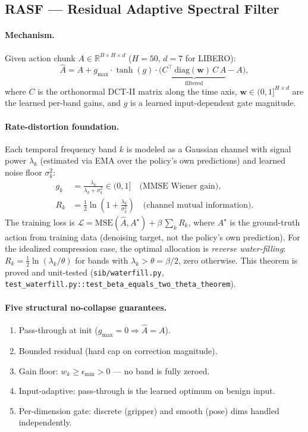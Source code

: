\documentclass[11pt,a4paper]{article}
\begin{document}
\subsection{RASF — Residual Adaptive Spectral Filter}

\paragraph{Mechanism.}
Given action chunk $A \in \mathbb{R}^{B\times H\times d}$ ($H=50$, $d=7$ for LIBERO):
\begin{equation}
  \hat{A} = A + g_{\max}\cdot\tanh(g)\cdot\bigl(\underbrace{C^\top \,\mathrm{diag}(\mathbf{w})\,C\,A}_{\text{filtered}} - A\bigr),
\end{equation}
where $C$ is the orthonormal DCT-II matrix along the time axis, $\mathbf{w} \in (0,1]^{H\times d}$
are the learned per-band gains, and $g$ is a learned input-dependent gate magnitude.

\paragraph{Rate-distortion foundation.}
Each temporal frequency band $k$ is modeled as a Gaussian channel with signal power $\lambda_k$
(estimated via EMA over the policy's own predictions) and learned noise floor $\sigma_k^2$:
\begin{align}
  g_k &= \frac{\lambda_k}{\lambda_k + \sigma_k^2} \in (0,1] \quad\text{(MMSE Wiener gain)}, \\
  R_k &= \tfrac{1}{2}\ln\!\left(1 + \tfrac{\lambda_k}{\sigma_k^2}\right) \quad\text{(channel mutual information)}.
\end{align}
The training loss is $\mathcal{L} = \mathrm{MSE}(\hat{A}, A^\star) + \beta\,\sum_k R_k$, where
$A^\star$ is the ground-truth action from training data (denoising target, not the policy's own
prediction). For the idealized compression case, the optimal allocation is \emph{reverse
water-filling}: $R_k = \tfrac{1}{2}\ln(\lambda_k/\theta)$ for bands with $\lambda_k > \theta =
\beta/2$, zero otherwise. This theorem is proved and unit-tested (\texttt{sib/waterfill.py},
\texttt{test\_waterfill.py::test\_beta\_equals\_two\_theta\_theorem}).

\paragraph{Five structural no-collapse guarantees.}
\begin{enumerate}[nosep,label=(\arabic*)]
  \item Pass-through at init ($g_{\max}=0 \Rightarrow \hat{A}=A$).
  \item Bounded residual (hard cap on correction magnitude).
  \item Gain floor: $w_k \geq \epsilon_{\min} > 0$ — no band is fully zeroed.
  \item Input-adaptive: pass-through is the learned optimum on benign input.
  \item Per-dimension gate: discrete (gripper) and smooth (pose) dims handled independently.
\end{enumerate}
\end{document}
